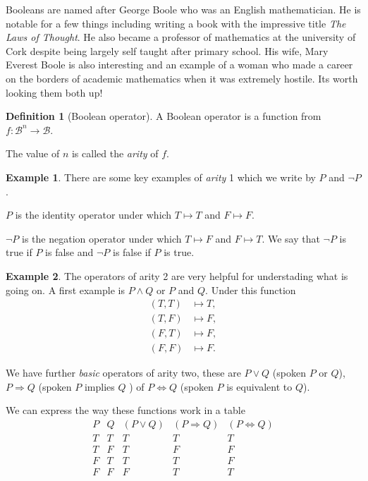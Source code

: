 \documentclass[
]{book}
\theoremstyle{definition}
\newtheorem{definition}{Definition}[chapter]
\theoremstyle{definition}
\newtheorem{example}{Example}[chapter]
\theoremstyle{definition}
\theoremstyle{definition}
\theoremstyle{remark}
\begin{document}
Booleans are named after George Boole who was an English mathematician. He is notable for a few things including writing a book with the impressive title \emph{The Laws of Thought}. He also became a professor of mathematics at the university of Cork despite being largely self taught after primary school. His wife, Mary Everest Boole is also interesting and an example of a woman who made a career on the borders of academic mathematics when it was extremely hostile. Its worth looking them both up!

\begin{definition}[Boolean operator]
A Boolean operator is a function from \(f: \mathcal{B}^n \rightarrow \mathcal{B}\).

The value of \(n\) is called the \emph{arity} of \(f\).
\end{definition}

\begin{example}
There are some key examples of \emph{arity} 1 which we write by \(P\) and \(\neg P\).

\(P\) is the identity operator under which \(T \mapsto T\) and \(F \mapsto F\).

\(\neg P\) is the negation operator under which \(T \mapsto F\) and \(F \mapsto T\). We say that \(\neg P\) is true if \(P\) is false and \(\neg P\) is false if \(P\) is true.
\end{example}

\begin{example}
The operators of arity 2 are very helpful for understading what is going on. A first example is \(P \wedge Q\) or \(P\) and \(Q\). Under this function
\begin{align*}
(T,T) & \mapsto T, \\
(T,F) & \mapsto F, \\
(F,T) & \mapsto F, \\
(F,F) & \mapsto F.
\end{align*}

We have further \emph{basic} operators of arity two, these are \(P \vee Q\) (spoken \(P\) or \(Q\)), \(P \Rightarrow Q\) (spoken \(P\) implies \(Q\) ) of \(P \Leftrightarrow Q\) (spoken \(P\) is equivalent to \(Q\)).

We can express the way these functions work in a table
\begin{equation}
\begin{array}{cc|ccc}
P & Q & (P \vee Q) & (P \Rightarrow Q) & (P \Leftrightarrow Q)\\
\hline
T & T & T & T & T \\
T & F & T & F & F \\
F & T & T & T & F \\
F & F & F & T & T
\end{array}
\end{equation}
\end{example}
\end{document}
